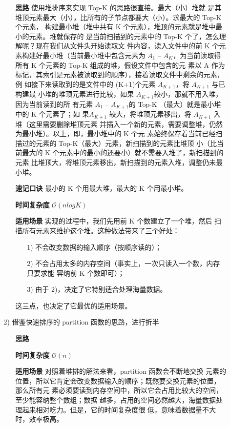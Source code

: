 \begin{enumerate}
\begin{itemize}
    \begin{itemize}
    \item [\textbf{思路}] 使用堆排序来实现 Top-K 的思路很直接。最大（小）堆就
      是其堆顶元素最大（小），比所有的子节点都要大（小）。求最大的 Top-K 个元素，
      构建最小堆（堆中共有 K 个元素），堆顶的元素就是堆中最小的元素。堆就保存的
      是当前扫描到的元素中的 Top-K 个了，怎么理解呢？现在我们从文件头开始读取文
      件内容，读入文件中的前 K 个元素构建好最小堆（当前最小堆中包含元素为 $A_1$
      -- $A_K$，为当前读取得所有 K 个元素的 Top-K 组成的堆，假设文件中包含的元
      素以 A 作为标记，其索引是元素被读取到的顺序），接着读取文件中剩余的元素，例
      如接下来读取到的是文件中的 (K+1)个元素 $A_{K+1}$，将 $A_{K+1}$ 与已构建最
      小堆的堆顶元素进行比较，如果 $A_{K+1}$较小，那就不用入堆，因为当前读到的所
      有元素 $A_1$ -- $A_{K+1}$的 Top-K （最大）就是最小堆中的 K 个元素了；如
      果$A_{K+1}$ 较大，将堆顶元素移出，将 $A_{K+1}$ 入堆（这里需要删除堆顶元素
      并插入一个新的元素，需要调整堆，仍然为最小堆）。以上，即，最小堆中的 K 个元
      素始终保存着当前已经扫描过的元素的 Top-K（最大）元素，新扫描到的元素比堆顶
      小（比当前最大的 K 个元素中的最小的还要小）就不需要入堆了，新扫描到的元素
      比堆顶大，将堆顶元素移出，新扫描到的元素入堆，调整仍未最小堆。
    \item[\textbf{速记口诀}] 最小的 K 个用最大堆，最大的 K 个用最小堆。
    \item[\textbf{时间复杂度}] $\mathcal{O}(nlogK)$
    \item[\textbf{适用场景}] 实现的过程中，我们先用前 K 个数建立了一个堆，然后
      扫描所有元素来维护这个堆。这种做法带来了三个好处：
      
      \begin{itemize}
      \item [1)] 不会改变数据的输入顺序（按顺序读的）；
      \item [2)] 不会占用太多的内存空间（事实上，一次只读入一个数，内存只要求能
        容纳前 K 个数即可）；
      \item [3)] 由于 2)，决定了它特别适合处理海量数据。
      \end{itemize}

      这三点，也决定了它最优的适用场景。

    \end{itemize}
    
  \item [2)] 借鉴快速排序的 partition 函数的思路，进行折半

    \begin{itemize}
    \item [\textbf{思路}] 
    \item [\textbf{时间复杂度}]  $\mathcal{O}(n)$
    \item [\textbf{适用场景}] 对照着堆排的解法来看，partition 函数会不断地交换
      元素的位置，所以它肯定会改变数据输入的顺序；既然要交换元素的位置，那么所有元
      素必须要读到内存空间中，所以它会占用比较大的空间，至少能容纳整个数组；数据
      越多，占用的空间必然越大，海量数据处理起来相对吃力。但是，它的时间复杂度很
      低，意味着数据量不大时，效率极高。
    \end{itemize}
    

\end{itemize}
\end{enumerate}
